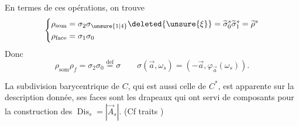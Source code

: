 En termes de ces opérations, on trouve
\[
\left\{\begin{aligned}
\rho_{\mathrm{som}}&=\sigma_2\sigma_{\unsure{1|4}}\deleted{\unsure{\xi}}=\widetilde\sigma_0^s\widetilde\sigma_1^s=\widetilde\rho^s\\
\rho_{\mathrm{face}}&=\sigma_1\sigma_0
\end{aligned}\right.
\]
Donc
\[
\rho_{\mathrm{som}}\rho_f=\sigma_2\sigma_0\overset{\mathrm{def}}=\sigma
\qquad\sigma(\vec a,\omega_s)=(-\vec a,\varphi_{\vec a}(\omega_s)).
\]


La subdivision barycentrique de $C$, qui est aussi celle de $C^*$, est apparente sur la description donnée, ses faces sont les drapeaux qui ont servi de composants pour la construction des $\operatorname{Dis}_s=|\vec A_s|$. (Cf traits )

